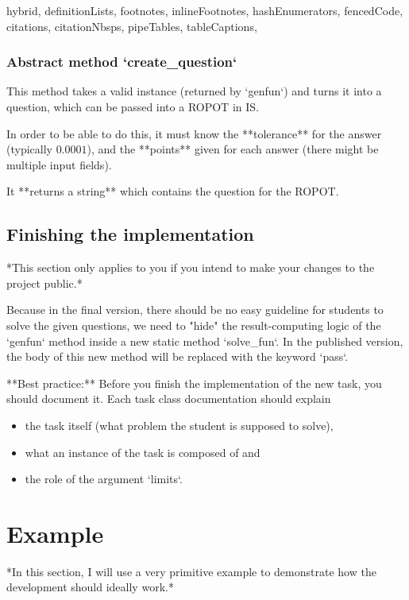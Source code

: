 \documentclass[
  digital, %
  table,   %
  twoside, %
  nolof,     %
  nolot,     %
  draft=false,
  final,
]{fithesis3}
\begin{document}
\begin{markdown*}{%
  hybrid,
  definitionLists,
  footnotes,
  inlineFootnotes,
  hashEnumerators,
  fencedCode,
  citations,
  citationNbsps,
  pipeTables,
  tableCaptions,
}
\subsubsection[Abstract method create_question]{Abstract method `create_question`} 

This method takes a valid instance (returned by `genfun`) and turns it into a question,
which can be passed into a ROPOT in IS. 

In order to be able to do this, it must know the **tolerance** for the answer (typically $0.0001$),
and the **points** given for each answer (there might be multiple input fields).

It **returns a string** which contains the question for the ROPOT.

\subsection{Finishing the implementation}

*This section only applies to you if you intend to make your changes to the project public.*

Because in the final version, there should be no easy guideline
for students to solve the given questions, we need to "hide" the
result-computing logic of the `genfun` method inside a new static method 
`solve_fun`. In the published version, the body of this new method will be 
replaced with the keyword `pass`.

\begin{shaded}{**Best practice:**}
Before you finish the implementation of the new task, you should document it. Each task class documentation should explain
\begin{itemize}
    \item the task itself (what problem the student is supposed to solve),
    \item what an instance of the task is composed of and 
    \item the role of the argument `limits`.
\end{itemize}
\end{shaded}

\section{Example}
\label{sec:example}

*In this section, I will use a very primitive example to demonstrate how the 
development should ideally work.*


\end{markdown*}
\end{document}
